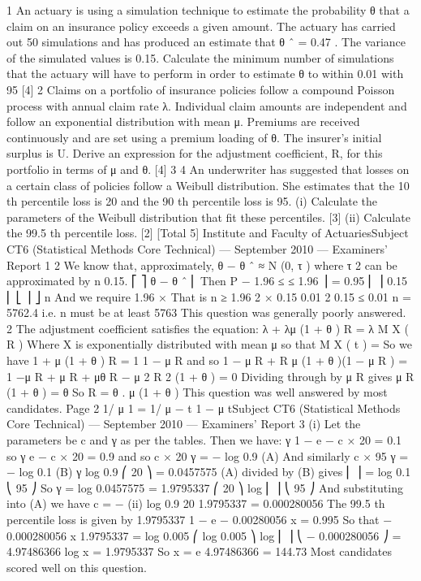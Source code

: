 \documentclass[a4paper,12pt]{article}
\begin{document}
 

1
An actuary is using a simulation technique to estimate the probability θ that a claim on an insurance policy exceeds a given amount. The actuary has carried out 50
simulations and has produced an estimate that θ ˆ = 0.47 . The variance of the simulated values is 0.15.
Calculate the minimum number of simulations that the actuary will have to perform in
order to estimate θ to within 0.01 with 95%
[4]
2
Claims on a portfolio of insurance policies follow a compound Poisson process with
annual claim rate λ. Individual claim amounts are independent and follow an
exponential distribution with mean μ. Premiums are received continuously and are
set using a premium loading of θ. The insurer’s initial surplus is U.
Derive an expression for the adjustment coefficient, R, for this portfolio in terms of μ
and θ.
[4]
3
4
An underwriter has suggested that losses on a certain class of policies follow a
Weibull distribution. She estimates that the 10 th percentile loss is 20 and the 90 th
percentile loss is 95.
(i) Calculate the parameters of the Weibull distribution that fit these percentiles. [3]
(ii) Calculate the 99.5 th percentile loss.
[2]
[Total 5]
Institute and Faculty of ActuariesSubject CT6 (Statistical Methods Core Technical) — September 2010 — Examiners’ Report
1
2
We know that, approximately, θ − θ ˆ ≈ N (0, τ ) where τ 2 can be approximated by
n
0.15.
⎡
⎤
θ − θ ˆ
⎢
Then P − 1.96 ≤
≤ 1.96 ⎥ = 0.95
⎢
⎥
0.15
⎢ ⎣
⎥ ⎦
n
And we require 1.96 ×
That is n ≥
1.96 2 × 0.15
0.01 2
0.15
≤ 0.01
n
= 5762.4 i.e. n must be at least 5763
This question was generally poorly answered.
2
The adjustment coefficient satisfies the equation:
λ + λμ (1 + θ ) R = λ M X ( R )
Where X is exponentially distributed with mean μ so that M X ( t ) =
So we have 1 + μ (1 + θ ) R =
1
1 − μ R
and so 1 − μ R + R μ (1 + θ )(1 − μ R ) = 1
−μ R + μ R + μθ R − μ 2 R 2 (1 + θ ) = 0
Dividing through by μ R gives
μ R (1 + θ ) = θ
So R =
θ
.
μ (1 + θ )
This question was well answered by most candidates.
Page 2
1/ μ
1
=
1/ μ − t 1 − μ tSubject CT6 (Statistical Methods Core Technical) — September 2010 — Examiners’ Report
3
(i)
Let the parameters be c and γ as per the tables.
Then we have:
γ
1 − e − c × 20 = 0.1 so
γ
e − c × 20 = 0.9 and so c × 20 γ = − log 0.9 (A)
And similarly c × 95 γ = − log 0.1 (B)
γ
log 0.9
⎛ 20 ⎞
= 0.0457575
(A) divided by (B) gives ⎜ ⎟ =
log 0.1
⎝ 95 ⎠
So γ =
log 0.0457575
= 1.9795337
⎛ 20 ⎞
log ⎜ ⎟
⎝ 95 ⎠
And substituting into (A) we have c = −
(ii)
log 0.9
20 1.9795337
= 0.000280056
The 99.5 th percentile loss is given by
1.9795337
1 − e − 0.00280056 x
= 0.995
So that − 0.000280056 x 1.9795337 = log 0.005
⎛ log 0.005 ⎞
log ⎜
⎟
⎝ − 0.000280056 ⎠ = 4.97486366
log x =
1.9795337
So x = e 4.97486366 = 144.73
Most candidates scored well on this question.
\end{document}
